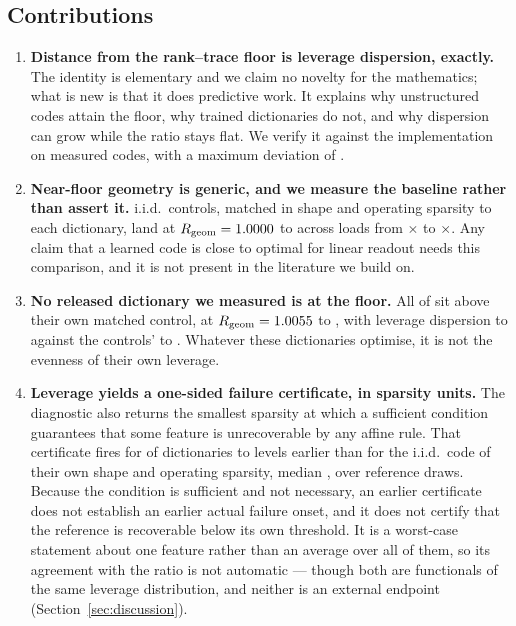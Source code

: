 \subsection{Contributions}

\begin{enumerate}[leftmargin=*,itemsep=3pt]

\item \textbf{Distance from the rank--trace floor is leverage dispersion, exactly.} The identity is
elementary and we claim no novelty for the mathematics; what is new is that it does predictive work.
It explains why unstructured codes attain the floor, why trained dictionaries do not, and why
dispersion can grow while the ratio stays flat. We verify it against the implementation on
\SaeIdentityRows{} measured codes, with a maximum deviation of \SaeIdentityGap{}.

\item \textbf{Near-floor geometry is generic, and we measure the baseline rather than assert it.}
\SaeControls{} i.i.d.\ controls, matched in shape and operating sparsity to each dictionary, land at
$R_{\mathrm{geom}}=1.0000$ to \SaeCtlRgeomMax{} across loads from \SaeLoadMin$\times$ to
\SaeLoadMax$\times$. Any claim that a learned code is close to optimal for linear readout needs this
comparison, and it is not present in the literature we build on.

\item \textbf{No released dictionary we measured is at the floor.} All \SaeDictsAboveControl{} of
\SaeDicts{} sit above their own matched control, at $R_{\mathrm{geom}}=1.0055$ to
\SaeDictRgeomMax{}, with leverage dispersion \SaeDictCvMin{} to \SaeDictCvMax{} against the
controls' \SaeCtlCvMin{} to \SaeCtlCvMax{}. Whatever these dictionaries optimise, it is not the
evenness of their own leverage.

\item \textbf{Leverage yields a one-sided failure certificate, in sparsity units.} The diagnostic
also returns the smallest sparsity at which a sufficient condition guarantees that some feature is
unrecoverable by any affine rule. That certificate fires for \SaeFailEarlier{} of \SaeDicts{}
dictionaries \SaeFailGapMin{} to \SaeFailGapMax{} levels earlier than for the i.i.d.\ code of their
own shape and operating sparsity, median \SaeFailGapMedian{}, over \SaeFailRefs{} reference draws.
Because the condition is sufficient and not necessary, an earlier certificate does not establish an
earlier actual failure onset, and it does not certify that the reference is recoverable below its
own threshold. It is a worst-case statement about one feature rather than an average over all of
them, so its agreement with the ratio is not automatic --- though both are functionals of the same
leverage distribution, and neither is an external endpoint (Section~\ref{sec:discussion}).


\end{enumerate}
